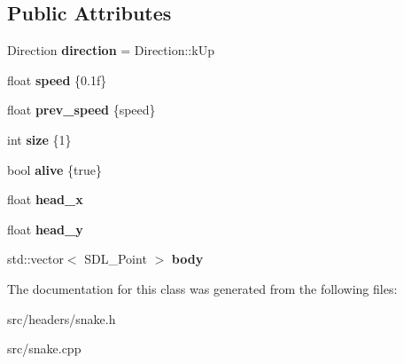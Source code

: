 \subsection*{Public Attributes}
\begin{DoxyCompactItemize}
\item 
Direction {\bfseries direction} = Direction\+::k\+Up\hypertarget{classSnake_a6b26c05b86ca6cdbd850d7cbadd32e8d}{}\label{classSnake_a6b26c05b86ca6cdbd850d7cbadd32e8d}

\item 
float {\bfseries speed} \{0.\+1f\}\hypertarget{classSnake_a094669fbc835da222339285f376f0494}{}\label{classSnake_a094669fbc835da222339285f376f0494}

\item 
float {\bfseries prev\+\_\+speed} \{speed\}\hypertarget{classSnake_a17dcac504074336d01bf616b3ef4ae9d}{}\label{classSnake_a17dcac504074336d01bf616b3ef4ae9d}

\item 
int {\bfseries size} \{1\}\hypertarget{classSnake_a3c9e9751f34ddc79cac932736c7ee718}{}\label{classSnake_a3c9e9751f34ddc79cac932736c7ee718}

\item 
bool {\bfseries alive} \{true\}\hypertarget{classSnake_a28ccc333925cd921ea0760b43bf5226c}{}\label{classSnake_a28ccc333925cd921ea0760b43bf5226c}

\item 
float {\bfseries head\+\_\+x}\hypertarget{classSnake_ac75c09dea7d08802d809980adab48cc0}{}\label{classSnake_ac75c09dea7d08802d809980adab48cc0}

\item 
float {\bfseries head\+\_\+y}\hypertarget{classSnake_ad63c9ba3e1c065bc72bd4e4647a49c5d}{}\label{classSnake_ad63c9ba3e1c065bc72bd4e4647a49c5d}

\item 
std\+::vector$<$ S\+D\+L\+\_\+\+Point $>$ {\bfseries body}\hypertarget{classSnake_a321d94eb13e000954671752788aff84e}{}\label{classSnake_a321d94eb13e000954671752788aff84e}

\end{DoxyCompactItemize}


The documentation for this class was generated from the following files\+:\begin{DoxyCompactItemize}
\item 
src/headers/snake.\+h\item 
src/snake.\+cpp\end{DoxyCompactItemize}
